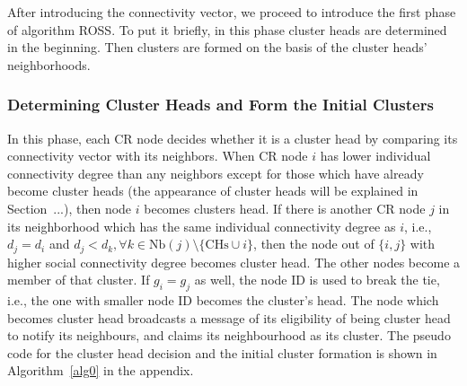 \documentclass[10pt,journal,compsoc]{IEEEtran}
\theoremstyle{mytheoremstyle}
\theoremstyle{mytheoremstyle}
\theoremstyle{mytheoremstyle}
\newcommand{\ie}{i.e., }
\begin{document}
After introducing the connectivity vector, we proceed to introduce the first phase of algorithm ROSS.
To put it briefly, in this phase cluster heads are determined in the beginning. Then clusters are formed on the basis of the cluster heads' neighborhoods.


\subsubsection{Determining Cluster Heads and Form the Initial Clusters}
In this phase, each CR node decides whether it is a cluster head by comparing its connectivity vector with its neighbors.
When CR node $i$ has lower individual connectivity degree than any neighbors except for those which have already become cluster heads (the appearance of cluster heads will be explained in Section~...), then node $i$ becomes clusters head.
If there is another CR node $j$ in its neighborhood which has the same individual connectivity degree as $i$, \ie $d_j = d_i$ and $d_j < d_{k}, \forall k\in \text{Nb}(j)\setminus \{\text{CHs}\cup i\}$, then the node out of $\{i, j\}$ with higher social connectivity degree becomes cluster head. The other nodes become a member of that cluster. 
If $g_i = g_j$ as well, the node ID is used to break the tie, \ie the one with smaller node ID becomes the cluster's head.
%
The node which becomes cluster head broadcasts a message of its eligibility of being cluster head to notify its neighbours, and claims its neighbourhood as its cluster.
The pseudo code for the cluster head decision and the initial cluster formation is shown in Algorithm~\ref{alg0} in the appendix.
\end{document}
